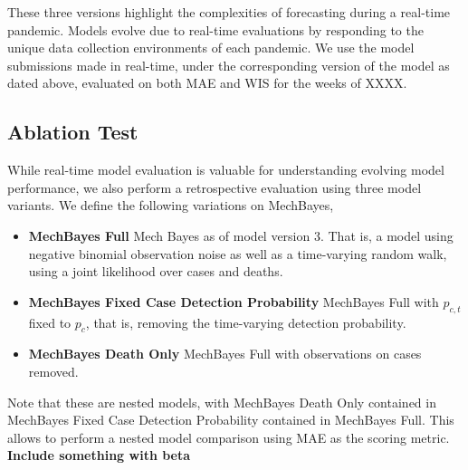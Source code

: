 \documentclass[11pt]{amsart}
\begin{document}
 
 These three versions highlight the complexities of forecasting during a real-time pandemic. Models evolve due to real-time evaluations by responding to the unique data collection environments of each pandemic. We use the model submissions made in real-time, under the corresponding version of the model as dated above, evaluated on both MAE and WIS for the weeks of XXXX.
 
 \subsection{Ablation Test}
 
 While real-time model evaluation is valuable for understanding evolving model performance, we also perform a retrospective evaluation using three model variants. We define the following variations on MechBayes,
 
 \begin{itemize}
 \item \textbf{MechBayes Full} Mech Bayes as of model version 3. That is, a model using negative binomial observation noise as well as a time-varying random walk, using a joint likelihood over cases and deaths.
 
 \item \textbf{MechBayes Fixed Case Detection Probability} MechBayes Full with $p_{c,t}$ fixed to $p_c$, that is, removing the time-varying detection probability.
 
 \item \textbf{MechBayes Death Only} MechBayes Full with observations on cases removed.
 \end{itemize}
 
 Note that these are nested models, with MechBayes Death Only contained in MechBayes Fixed Case Detection Probability contained in MechBayes Full. This allows to perform a nested model comparison using MAE as the scoring metric. \textbf{Include something with beta}
\end{document}
